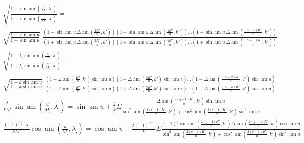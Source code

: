 \documentclass{article}
\begin{document}
\[
\begin{gathered}
\sqrt{\frac{1-\sin\operatorname{am}\left(\frac{u}{M_{,}},\lambda_{,}\right)}{1+\sin\operatorname{am}\left(\frac{u}{M_{,}},\lambda_{,}\right)}}=\\[2.5ex]
\sqrt{\frac{1-\sin\operatorname{am}u}{1+\sin\operatorname{am}u}}.\frac{\left(1-\sin\operatorname{am}u\,\Delta\operatorname{am}\left(\frac{2K'}{n},k'\right)\right)\left(1-\sin\operatorname{am}u\,\Delta\operatorname{am}\left(\frac{4K'}{n},k'\right)\right)\ldots\left(1-\sin\operatorname{am}u\,\Delta\operatorname{am}\left(\frac{(n-1)K'}{n},k'\right)\right)}{\left(1+\sin\operatorname{am}u\,\Delta\operatorname{am}\left(\frac{2K'}{n},k'\right)\right)\left(1+\sin\operatorname{am}u\,\Delta\operatorname{am}\left(\frac{4K'}{n},k'\right)\right)\ldots\left(1+\sin\operatorname{am}u\,\Delta\operatorname{am}\left(\frac{(n-1)K'}{n},k'\right)\right)}\\[2.5ex]
\sqrt{\frac{1-\lambda_{,}\sin\operatorname{am}\left(\frac{u}{M_{,}},\lambda_{,}\right)}{1+\lambda_{,}\sin\operatorname{am}\left(\frac{u}{M_{,}},\lambda_{,}\right)}}=\\[2.5ex]
\sqrt{\frac{1-k\sin\operatorname{am}u}{1+k\sin\operatorname{am}u}}.\frac{\left(1-\Delta\operatorname{am}\left(\frac{K'}{n},k'\right)\sin\operatorname{am}u\right)\left(1-\Delta\operatorname{am}\left(\frac{3K'}{n},k'\right)\sin\operatorname{am}u\right)\ldots\left(1-\Delta\operatorname{am}\left(\frac{(n-2)K'}{n},k'\right)\sin\operatorname{am}u\right)}{\left(1+\Delta\operatorname{am}\left(\frac{K'}{n},k'\right)\sin\operatorname{am}u\right)\left(1+\Delta\operatorname{am}\left(\frac{3K'}{n},k'\right)\sin\operatorname{am}u\right)\ldots\left(1+\Delta\operatorname{am}\left(\frac{(n-2)K'}{n},k'\right)\sin\operatorname{am}u\right)}\\[2.5ex]
\frac{\lambda_{,}}{kM_{,}}\sin\operatorname{am}\left(\frac{u}{M_{,}},\lambda_{,}\right)=\sin\operatorname{am}u+\frac{2}{k}\Sigma\frac{\Delta\operatorname{am}\left(\frac{2(q-1)K'}{n},k'\right)\sin\operatorname{am}u}{\sin^{2}\operatorname{am}\left(\frac{2(q-1)K'}{n},k'\right)+\cos^{2}\operatorname{am}\left(\frac{2(q-1)K'}{n},k'\right)\sin^{2}\operatorname{am}u}\\[2.5ex]
\frac{(-1)^{\frac{n-1}{2}}\lambda_{,}}{kM_{,}}\cos\operatorname{am}\left(\frac{u}{M_{,}},\lambda_{,}\right)=\cos\operatorname{am}u-\frac{2(-1)^{\frac{n-1}{2}}}{k}\Sigma\frac{(-1)^{q}\sin\operatorname{am}\left(\frac{2(q-1)K'}{n},k'\right)\Delta\operatorname{am}\left(\frac{2(q-1)K'}{n},k'\right)\cos\operatorname{am}u}{\sin^{2}\operatorname{am}\left(\frac{2(q-1)K'}{n},k'\right)+\cos^{2}\operatorname{am}\left(\frac{2(q-1)K'}{n},k'\right)\sin^{2}\operatorname{am}u}\\[2.5ex]

\end{gathered}\]
\end{document}
